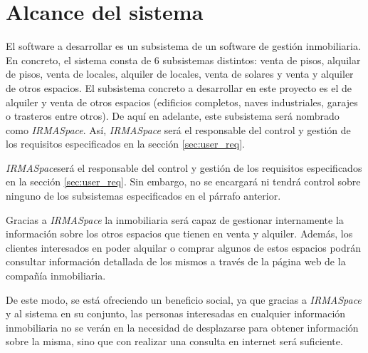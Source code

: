 \section{Alcance del sistema}\label{sec:scope}
\par El software a desarrollar es un subsistema de un software de gestión inmobiliaria. En concreto, el sistema consta de 6 subsistemas distintos: venta de pisos, alquilar de pisos, venta de locales, alquiler de locales, venta de solares y venta y alquiler de otros espacios. El subsistema concreto a desarrollar en este proyecto es el de alquiler y venta de otros espacios (edificios completos, naves industriales, garajes o trasteros entre otros). De aquí en adelante, este subsistema será nombrado como \textit{IRMASpace}. Así, \textit{IRMASpace} será el responsable del control y gestión de los requisitos especificados en la sección \ref{sec:user_req}.

\par \textit{IRMASpace}será el responsable del control y gestión de los requisitos especificados en la sección \ref{sec:user_req}. Sin embargo, no se encargará ni tendrá control sobre ninguno de los subsistemas especificados en el párrafo anterior.

\par Gracias a \textit{IRMASpace} la inmobiliaria será capaz de gestionar internamente la información sobre los otros espacios que tienen en venta y alquiler. Además, los clientes interesados en poder alquilar o comprar algunos de estos espacios podrán consultar información detallada de los mismos a través de la página web de la compañía inmobiliaria.

\par De este modo, se está ofreciendo un beneficio social, ya que gracias a \textit{IRMASpace} y al sistema en su conjunto, las personas interesadas en cualquier información inmobiliaria no se verán en la necesidad de desplazarse para obtener información sobre la misma, sino que con realizar una consulta en internet será suficiente.
